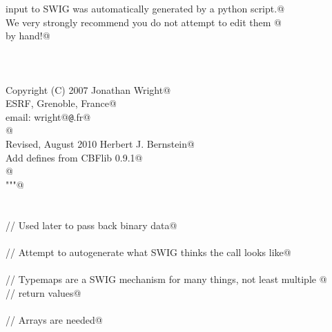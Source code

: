 \documentclass[10pt,a4paper,twoside,notitlepage]{article}
\begin{document}
\begin{flushleft}
\begin{list}{}{}
\mbox{}\verb@ input to SWIG was automatically generated by a python script.@\\
\mbox{}\verb@ We very strongly recommend you do not attempt to edit them @\\
\mbox{}\verb@ by hand!@\\
\mbox{}\verb@@\\
\mbox{}\verb@@\\
\mbox{}\verb@@\\
\mbox{}\verb@ Copyright (C) 2007    Jonathan Wright@\\
\mbox{}\verb@                       ESRF, Grenoble, France@\\
\mbox{}\verb@                email: wright@{\tt @}\verb@esrf.fr@\\
\mbox{}\verb@    @\\
\mbox{}\verb@  Revised, August 2010  Herbert J. Bernstein@\\
\mbox{}\verb@    Add defines from CBFlib 0.9.1@\\
\mbox{}\verb@    @\\
\mbox{}\verb@"""@\\
\mbox{}\verb@%}@\\
\mbox{}\verb@@\\
\mbox{}\verb@@\\
\mbox{}\verb@// Used later to pass back binary data@\\
\mbox{}\verb@%include "cstring.i"@\\
\mbox{}\verb@@\\
\mbox{}\verb@// Attempt to autogenerate what SWIG thinks the call looks like@\\
\mbox{}\verb@@\\
\mbox{}\verb@// Typemaps are a SWIG mechanism for many things, not least multiple @\\
\mbox{}\verb@// return values@\\
\mbox{}\verb@%include "typemaps.i"@\\
\mbox{}\verb@@\\
\mbox{}\verb@// Arrays are needed@\\
\mbox{}\verb@%include "carrays.i"@\\
\mbox{}\verb@%array_class(double, doubleArray)@\\
\mbox{}\verb@%array_class(int, intArray)@\\
\mbox{}\verb@%array_class(short, shortArray)@\\
\mbox{}\verb@%array_class(long, longArray)@\\
\mbox{}\verb@@\\

\end{list}
\end{flushleft}
\end{document}
